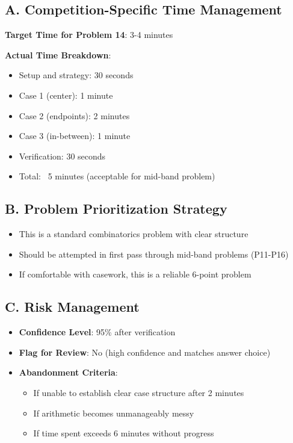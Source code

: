\documentclass[]{article}
\begin{document}
\begin{competitionbox}
\subsection*{A. Competition-Specific Time Management}
\textbf{Target Time for Problem 14}: 3-4 minutes

\textbf{Actual Time Breakdown}:
\begin{itemize}[leftmargin=*]
    \item Setup and strategy: 30 seconds
    \item Case 1 (center): 1 minute
    \item Case 2 (endpoints): 2 minutes
    \item Case 3 (in-between): 1 minute
    \item Verification: 30 seconds
    \item Total: ~5 minutes (acceptable for mid-band problem)
\end{itemize}

\subsection*{B. Problem Prioritization Strategy}
\begin{itemize}[leftmargin=*]
    \item This is a standard combinatorics problem with clear structure
    \item Should be attempted in first pass through mid-band problems (P11-P16)
    \item If comfortable with casework, this is a reliable 6-point problem
\end{itemize}

\subsection*{C. Risk Management}
\begin{itemize}[leftmargin=*]
    \item \textbf{Confidence Level}: 95\% after verification
    \item \textbf{Flag for Review}: No (high confidence and matches answer choice)
    \item \textbf{Abandonment Criteria}: 
    \begin{itemize}
        \item If unable to establish clear case structure after 2 minutes
        \item If arithmetic becomes unmanageably messy
        \item If time spent exceeds 6 minutes without progress
    \end{itemize}
\end{itemize}


\end{competitionbox}
\end{document}
